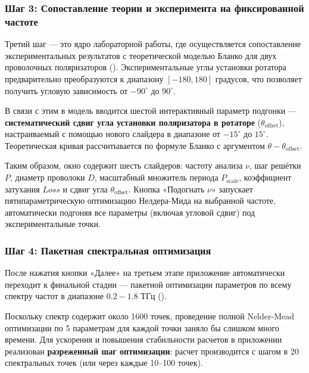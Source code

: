 
\subsubsection{Шаг 3: Сопоставление теории и эксперимента на фиксированной частоте}

Третий шаг — это ядро лабораторной работы, где осуществляется сопоставление экспериментальных результатов с теоретической моделью Бланко для двух проволочных поляризаторов (). Экспериментальные углы установки ротатора предварительно преобразуются к диапазону $[-180, 180]$ градусов, что позволяет получить угловую зависимость от $-90^\circ$ до $90^\circ$.

В связи с этим в модель вводится шестой интерактивный параметр подгонки — \textbf{систематический сдвиг угла установки поляризатора в ротаторе} ($\theta_{\text{offset}}$), настраиваемый с помощью нового слайдера в диапазоне от $-15^\circ$ до $15^\circ$. Теоретическая кривая рассчитывается по формуле Бланко с аргументом $\theta - \theta_{\text{offset}}$.

Таким образом, окно содержит шесть слайдеров: частоту анализа $\nu$, шаг решётки $P$, диаметр проволоки $D$, масштабный множитель периода $P_{\text{scale}}$, коэффициент затухания $Loss$ и сдвиг угла $\theta_{\text{offset}}$. Кнопка «Подогнать $\nu$» запускает пятипараметрическую оптимизацию Нелдера-Мида на выбранной частоте, автоматически подгоняя все параметры (включая угловой сдвиг) под экспериментальные точки.


\subsubsection{Шаг 4: Пакетная спектральная оптимизация}

После нажатия кнопки «Далее» на третьем этапе приложение автоматически переходит к финальной стадии — пакетной оптимизации параметров по всему спектру частот в диапазоне $0.2 - 1.8$ ТГц ().

Поскольку спектр содержит около 1600 точек, проведение полной Nelder-Mead оптимизации по 5 параметрам для каждой точки заняло бы слишком много времени. Для ускорения и повышения стабильности расчетов в приложении реализован \textbf{разреженный шаг оптимизации}: расчет производится с шагом в 20 спектральных точек (или через каждые 10--100 точек).

